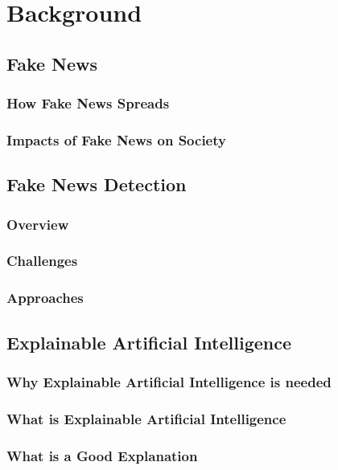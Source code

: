 
\chapter{Background}\label{chapter:background}

\section{Fake News}

\subsection{How Fake News Spreads}

\subsection{Impacts of Fake News on Society}

\section{Fake News Detection}

\subsection{Overview}

\subsection{Challenges}

\subsection{Approaches}

\section{Explainable Artificial Intelligence}

\subsection{Why Explainable Artificial Intelligence is needed}

\subsection{What is Explainable Artificial Intelligence}

\subsection{What is a Good Explanation}
